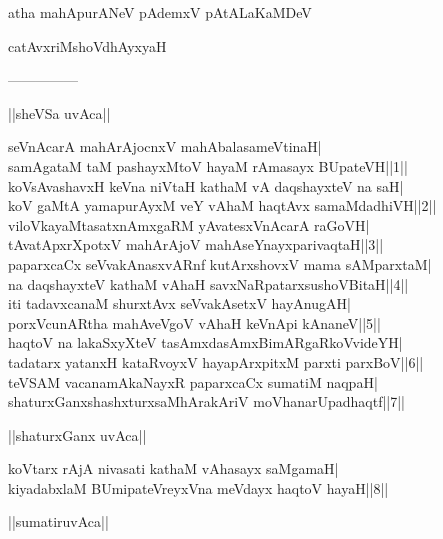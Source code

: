 \documentclass{article}
\begin{document}
\begin{center}
atha mahApurANeV pAdemxV pAtALaKaMDeV
\end{center}

\begin{center}
catAvxriMshoVdhAyxyaH
\end{center}

\begin{center}
---------------
\end{center}

\begin{center}
||sheVSa uvAca||
\end{center}

seVnAcarA mahArAjocnxV mahAbalasameVtinaH|\\
samAgataM taM pashayxMtoV hayaM rAmasayx BUpateVH||1||\\
koVsAvashavxH keVna niVtaH kathaM vA daqshayxteV na saH|\\
koV gaMtA yamapurAyxM veY vAhaM haqtAvx samaMdadhiVH||2||\\
viloVkayaMtasatxnAmxgaRM yAvatesxVnAcarA raGoVH|\\
tAvatApxrXpotxV mahArAjoV mahAseYnayxparivaqtaH||3||\\
paparxcaCx seVvakAnasxvARnf kutArxshovxV mama sAMparxtaM|\\
na daqshayxteV kathaM vAhaH savxNaRpatarxsushoVBitaH||4||\\
iti tadavxcanaM shurxtAvx seVvakAsetxV hayAnugAH|\\
porxVcunARtha mahAveVgoV vAhaH keVnApi kAnaneV||5||\\
haqtoV na lakaSxyXteV tasAmxdasAmxBimARgaRkoVvideYH|\\
tadatarx yatanxH kataRvoyxV hayapArxpitxM parxti parxBoV||6||\\
teVSAM vacanamAkaNayxR paparxcaCx sumatiM naqpaH|\\
shaturxGanxshashxturxsaMhArakAriV moVhanarUpadhaqtf||7||\\

\begin{center}
||shaturxGanx uvAca||
\end{center}

koVtarx rAjA nivasati kathaM vAhasayx saMgamaH|\\
kiyadabxlaM BUmipateVreyxVna meVdayx haqtoV hayaH||8||\\

\begin{center}
||sumatiruvAca||
\end{center}
\end{document}
